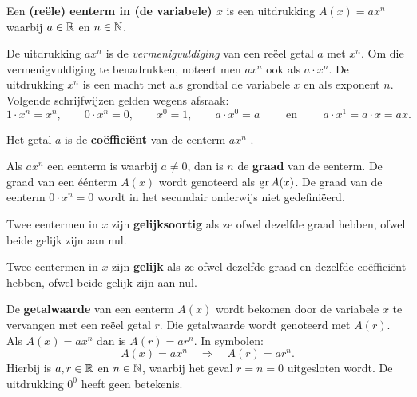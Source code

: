 \documentclass{ximera}
\begin{document}
\begin{definition} 
Een \textbf{(reële) eenterm in (de variabele) $x$} is een uitdrukking $A(x) = ax^n$ waarbij $a \in \mathbb{R}$ en $n \in \mathbb{N}$. 

De uitdrukking $ax^n$ is de \textit{ vermenigvuldiging} van een reëel getal $a$ met $x^n$. Om die vermenigvuldiging te benadrukken, noteert men $ax^n$  ook als $a \cdot x^n$. De uitdrukking $x^n$ is een macht met als grondtal de variabele $x$ en als exponent $n$. Volgende schrijfwijzen gelden wegens afsraak:
\[
1\cdot x^n = x^n, \qquad
0\cdot x^n = 0, \qquad  
x^0 = 1, \qquad 
a\cdot x^0 = a \qquad \text{ en } \qquad 
a\cdot x^1 = a \cdot x = ax.
\]

Het getal $a$ is de \textbf{coëfficiënt} van de eenterm $ax^n$ .

Als $ax^n$ een eenterm is waarbij $a \neq 0$, dan is $n$ de \textbf{graad} van de eenterm. De graad van een éénterm \(A(x)\) wordt genoteerd als $\operatorname{gr} A(x)$. De graad van de eenterm $0\cdot x^n = 0$ wordt in het secundair onderwijs niet gedefiniëerd.


Twee eentermen in $x$ zijn \textbf{gelijksoortig} als ze ofwel dezelfde graad hebben, ofwel beide gelijk zijn aan nul.

Twee eentermen in $x$ zijn \textbf{gelijk} als ze ofwel dezelfde graad en dezelfde coëfficiënt hebben, ofwel beide gelijk zijn aan nul.


De \textbf{getalwaarde} van een eenterm $A(x)$ wordt bekomen door de variabele $x$ te vervangen met een reëel getal $r$. Die getalwaarde wordt genoteerd met $A(r)$. Als $A(x) = ax^n$ dan is $A(r) = ar^n$. In symbolen:
\[
A(x) = ax^n \quad \Rightarrow \quad A(r) = a r^n.
\]
Hierbij is $a,r \in \mathbb{R}$ en $n \in \mathbb{N}$, waarbij het geval $r = n = 0$ uitgesloten wordt. De uitdrukking $0^0$ heeft geen betekenis.


\end{definition} 


\end{document}
